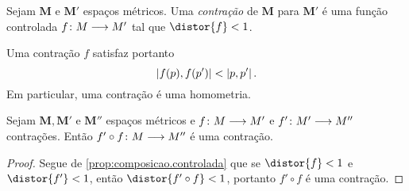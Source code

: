 \begin{definition}
Sejam $\bm M$ e $\bm M'$ espaços métricos. Uma \emph{contração} de $\bm M$ para $\bm M'$ é uma função controlada ${f}\colon {M} \longrightarrow {M'}$ tal que $\distor{f} < 1$.
\end{definition}

Uma contração $f$ satisfaz portanto
	\begin{equation*}
	\left\vert{f(p)},{f(p')}\right\vert < \left\vert{p},{p'}\right\vert.
	\end{equation*}
Em particular, uma contração é uma homometria.

\begin{proposition}
\label{prop:composicao.contracao}
Sejam $\bm M, \bm M'$ e $\bm M''$ espaços métricos e ${f}\colon {M} \longrightarrow {M'}$ e ${f'}\colon {M'} \longrightarrow {M''}$ contrações. Então ${f' \circ f}\colon {M} \longrightarrow {M''}$ é uma contração.
\end{proposition}
\begin{proof}
Segue de \ref{prop:composicao.controlada} que se $\distor{f} < 1$ e $\distor{f'} < 1$, então $\distor{f' \circ f} < 1$, portanto $f' \circ f$ é uma contração.
\end{proof}

